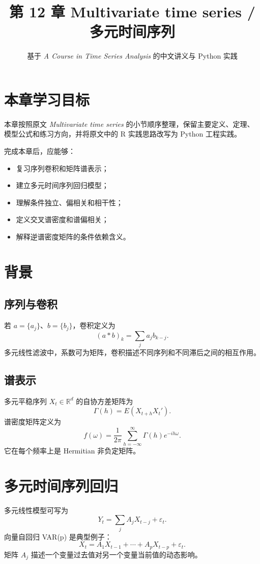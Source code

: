 \documentclass[11pt,a4paper]{ctexart}
\title{第 12 章 \quad Multivariate time series / 多元时间序列}
\author{基于 \textit{A Course in Time Series Analysis} 的中文讲义与 Python 实践}
\date{}
\begin{document}
\maketitle

\section*{本章学习目标}

本章按照原文 \textit{Multivariate time series} 的小节顺序整理，保留主要定义、定理、模型公式和练习方向，并将原文中的 R 实践思路改写为 Python 工程实践。

完成本章后，应能够：
\begin{itemize}
  \item 复习序列卷积和矩阵谱表示；
  \item 建立多元时间序列回归模型；
  \item 理解条件独立、偏相关和相干性；
  \item 定义交叉谱密度和谱偏相关；
  \item 解释逆谱密度矩阵的条件依赖含义。
\end{itemize}

\section{背景}

\subsection{序列与卷积}

若 \(a=\{a_j\}\)、\(b=\{b_j\}\)，卷积定义为
\[
  (a*b)_k=\sum_j a_jb_{k-j}.
\]
多元线性滤波中，系数可为矩阵，卷积描述不同序列和不同滞后之间的相互作用。

\subsection{谱表示}

多元平稳序列 \(X_t\in\mathbb R^d\) 的自协方差矩阵为
\[
  \Gamma(h)=E(X_{t+h}X_t').
\]
谱密度矩阵定义为
\[
  f(\omega)=\frac1{2\pi}\sum_{h=-\infty}^{\infty}\Gamma(h)e^{-ih\omega}.
\]
它在每个频率上是 Hermitian 非负定矩阵。

\section{多元时间序列回归}

多元线性模型可写为
\[
  Y_t=\sum_{j}A_jX_{t-j}+\varepsilon_t.
\]
向量自回归 VAR(p) 是典型例子：
\[
  X_t=A_1X_{t-1}+\cdots+A_pX_{t-p}+\varepsilon_t.
\]
矩阵 \(A_j\) 描述一个变量过去值对另一个变量当前值的动态影响。
\end{document}
